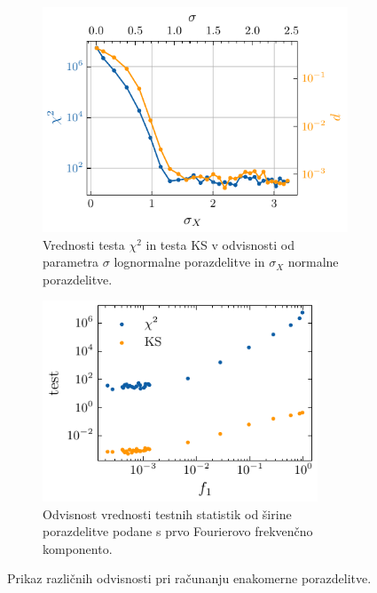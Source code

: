 \documentclass[11pt, oneside]{article}
\theoremstyle{definition}
\begin{document}
\begin{figure}[h!]
    \centering
    \begin{subfigure}[b]{0.49\textwidth}
        \centering
        \includegraphics[width=1\textwidth]{stat_lognorm_tests.pdf}
        \caption{Vrednosti testa  $\chi^2$ in testa KS v odvisnosti od parametra $\sigma$ lognormalne porazdelitve in $\sigma_X$ normalne porazdelitve.}
        \label{fig: test1}
    \end{subfigure}
    \hfill
    \begin{subfigure}[b]{0.49\textwidth}
        \centering
        \includegraphics[width=0.9\textwidth]{test_lognorm_f1_chi2_KS.pdf}
        \caption{Odvisnost vrednosti testnih statistik od širine porazdelitve podane s prvo Fourierovo frekvenčno komponento.}
        \label{fig: test2}
    \end{subfigure}
    \caption{Prikaz različnih odvisnosti pri računanju enakomerne porazdelitve.}
    \label{fig: test}
\end{figure}
\end{document}
